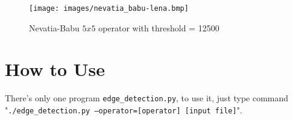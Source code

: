 \documentclass[14pt,a4paper]{extarticle}
\begin{document}
\begin{figure}[H]
\centering
\texttt{[image: images/nevatia\_babu-lena.bmp]}
\caption{Nevatia-Babu $5x5$ operator with threshold = 12500}
\end{figure}

\section{How to Use}

There's only one program \texttt{edge\_detection.py}, to use it, just type command "\texttt{./edge\_detection.py --operator=[operator] [input file]}".
\end{document}
